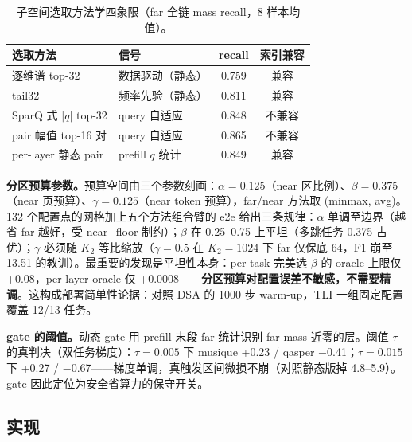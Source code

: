 \documentclass[11pt]{article}
\begin{document}
\begin{table}[h]\centering
\caption{子空间选取方法学四象限（far 全链 mass recall，8 样本均值）。}
\label{tab:select}
\begin{tabular}{llcc}
\toprule
选取方法 & 信号 & recall & 索引兼容 \\
\midrule
逐维谱 top-32 & 数据驱动（静态） & 0.759 & 兼容 \\
tail32 & 频率先验（静态） & 0.811 & 兼容 \\
SparQ 式 $|q|$ top-32 & query 自适应 & 0.848 & 不兼容 \\
pair 幅值 top-16 对 & query 自适应 & 0.865 & 不兼容 \\
per-layer 静态 pair & prefill $q$ 统计 & 0.849 & 兼容 \\
\bottomrule
\end{tabular}
\end{table}

\textbf{分区预算参数。}预算空间由三个参数刻画：$\alpha{=}0.125$（near 区比例）、$\beta{=}0.375$（near 页预算）、$\gamma{=}0.125$（near token 预算），far/near 方法取 (minmax, avg)。132 个配置点的网格加上五个方法组合臂的 e2e 给出三条规律：$\alpha$ 单调至边界（越省 far 越好，受 near\_floor 制约）；$\beta$ 在 0.25--0.75 上平坦（多跳任务 0.375 占优）；$\gamma$ 必须随 $K_2$ 等比缩放（$\gamma{=}0.5$ 在 $K_2{=}1024$ 下 far 仅保底 64，F1 崩至 13.51 的教训）。最重要的发现是平坦性本身：per-task 完美选 $\beta$ 的 oracle 上限仅 +0.08，per-layer oracle 仅 +0.0008——\textbf{分区预算对配置误差不敏感，不需要精调}。这构成部署简单性论据：对照 DSA 的 1000 步 warm-up，TLI 一组固定配置覆盖 12/13 任务。

\textbf{gate 的阈值。}动态 gate 用 prefill 末段 far 统计识别 far mass 近零的层。阈值 $\tau$ 的真判决（双任务梯度）：$\tau{=}0.005$ 下 musique +0.23 / qasper $-$0.41；$\tau{=}0.015$ 下 +0.27 / $-$0.67——梯度单调，真触发区间微损不崩（对照静态版掉 4.8--5.9）。gate 因此定位为安全省算力的保守开关。

\subsection{实现}
\end{document}
